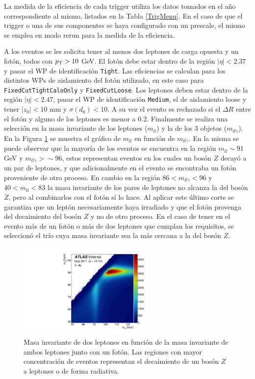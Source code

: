 La medida de la eficiencia de cada trigger utiliza los datos tomados en el año correspondiente al mismo, listados en la Tabla \ref{TrigMenu}. En el caso de que el trigger o una de sus componentes se haya configurado con un prescale, el mismo se emplea en modo rerun para la medida de la eficiencia. 


A los eventos se les solicita tener al menos dos leptones de carga opuesta y un fotón, todos con $p_{\text{T}}>10$ GeV. El fotón debe estar dentro de la región $|\eta| < 2.37$ y pasar el WP de identificación \texttt{Tight}. Las eficiencias se calculan para los distintos WPs de aislamiento del fotón utilizado, en este caso para \texttt{FixedCutTightCaloOnly} y \texttt{FixedCutLoose}. Los leptones deben estar dentro de la región $|\eta| < 2.47$, pasar el WP de identificación \texttt{Medium}, el de aislamiento loose y tener $|z_0| < 10$ mm y $\sigma(d_0) < 10$. A su vez el evento es rechazado si el $\Delta R$ entre el fotón y alguno de los leptones es menor a 0.2. Finalmente se realiza una selección en la masa invariante de los leptones ($m_{ll}$) y la de los 3 objetos ($m_{ll\gamma}$). En la Figura \ref{mllgmll} se muestra el gráfico de $m_{ll}$ en función de $m_{ll\gamma}$. En la misma se puede observar que la mayoría de los eventos se encuentra en la región $m_{ll}\sim91$ GeV y $m_{ll\gamma}>\sim96$, estos representan eventos en los cuales un bosón $Z$ decayó a un par de leptones, y que adicionalmente en el evento se encontraba un fotón proveniente de otro proceso. En cambio en la región $86<m_{ll\gamma}<96$ y $40<m_{ll}<83$ la masa invariante de los pares de leptones no alcanza la del bosón $Z$, pero al combinarlos con el fotón sí lo hace. Al aplicar este último corte se garantiza que un leptón necesariamente haya irradiado y que el fotón provenga del decaimiento del bosón $Z$ y no de otro proceso. En el caso de tener en el evento más de un fotón o más de dos leptones que cumplan los requisitos, se seleccionó el trío cuya masa invariante sea la más cercana a la del bosón $Z$.

\begin{figure}
  \centering
  \includegraphics[width=0.6\textwidth]{images/trigger/h_mllg_mll.pdf}
	\caption{Masa invariante de dos leptones en función de la masa invariante de ambos leptones junto con un fotón. Las regiones con mayor concentración de eventos representan el decaimiento de un bosón $Z$ a leptones o de forma radiativa.}
  \label{mllgmll}
\end{figure}

